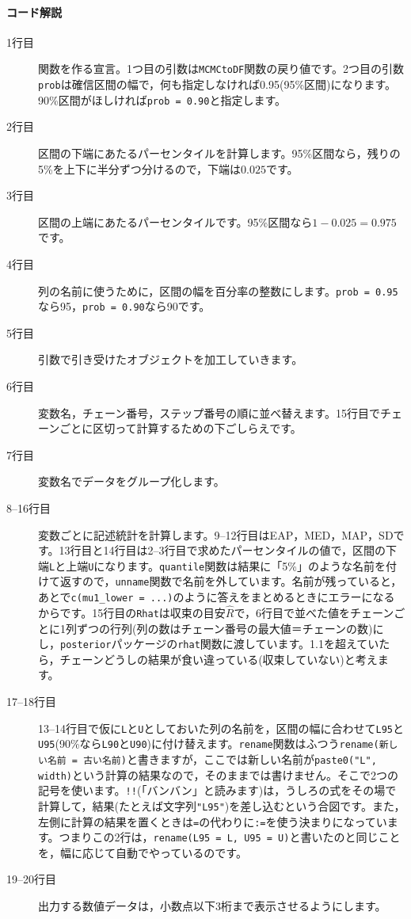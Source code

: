 \documentclass{ltjsbook}
\begin{document}
\paragraph{コード解説}
\begin{description}
	\item[1行目] 関数を作る宣言。1つ目の引数は\verb|MCMCtoDF|関数の戻り値です。2つ目の引数\verb|prob|は確信区間の幅で，何も指定しなければ0.95(95\%区間)になります。90\%区間がほしければ\verb|prob = 0.90|と指定します。
	\item[2行目] 区間の下端にあたるパーセンタイルを計算します。95\%区間なら，残りの5\%を上下に半分ずつ分けるので，下端は\(0.025\)です。
	\item[3行目] 区間の上端にあたるパーセンタイルです。95\%区間なら\(1-0.025=0.975\)です。
	\item[4行目] 列の名前に使うために，区間の幅を百分率の整数にします。\verb|prob = 0.95|なら95，\verb|prob = 0.90|なら90です。
	\item[5行目] 引数で引き受けたオブジェクトを加工していきます。
	\item[6行目] 変数名，チェーン番号，ステップ番号の順に並べ替えます。15行目でチェーンごとに区切って計算するための下ごしらえです。
	\item[7行目] 変数名でデータをグループ化します。
	\item[8--16行目] 変数ごとに記述統計を計算します。9--12行目はEAP，MED，MAP，SDです。13行目と14行目は2--3行目で求めたパーセンタイルの値で，区間の下端\verb|L|と上端\verb|U|になります。\verb|quantile|関数は結果に「5\%」のような名前を付けて返すので，\verb|unname|関数で名前を外しています。名前が残っていると，あとで\verb|c(mu1_lower = ...)|のように答えをまとめるときにエラーになるからです。15行目の\verb|Rhat|は収束の目安\(\hat{R}\)で，6行目で並べた値をチェーンごとに1列ずつの行列(列の数はチェーン番号の最大値＝チェーンの数)にし，\verb|posterior|パッケージの\verb|rhat|関数に渡しています。1.1を超えていたら，チェーンどうしの結果が食い違っている(収束していない)と考えます。
	\item[17--18行目] 13--14行目で仮に\verb|L|と\verb|U|としておいた列の名前を，区間の幅に合わせて\verb|L95|と\verb|U95|(90\%なら\verb|L90|と\verb|U90|)に付け替えます。\verb|rename|関数はふつう\verb|rename(新しい名前 = 古い名前)|と書きますが，ここでは新しい名前が\verb|paste0("L", width)|という計算の結果なので，そのままでは書けません。そこで2つの記号を使います。\verb|!!|(「バンバン」と読みます)は，うしろの式をその場で計算して，結果(たとえば文字列\verb|"L95"|)を差し込むという合図です。また，左側に計算の結果を置くときは\verb|=|の代わりに\verb|:=|を使う決まりになっています。つまりこの2行は，\verb|rename(L95 = L, U95 = U)|と書いたのと同じことを，幅に応じて自動でやっているのです。
	\item[19--20行目] 出力する数値データは，小数点以下3桁まで表示させるようにします。
\end{description}
\end{document}
